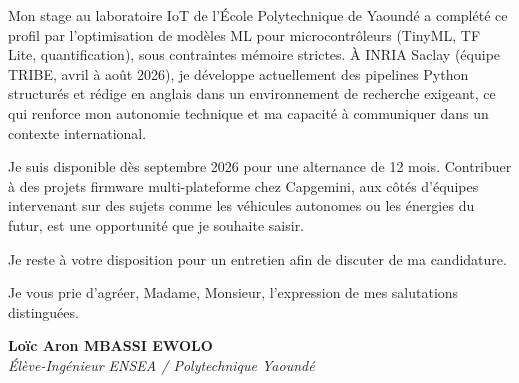 \documentclass[a4paper,11pt]{article}
\begin{document}
Mon stage au laboratoire IoT de l'École Polytechnique de Yaoundé a complété ce profil par l'optimisation de modèles ML pour microcontrôleurs (TinyML, TF Lite, quantification), sous contraintes mémoire strictes. À INRIA Saclay (équipe TRIBE, avril à août 2026), je développe actuellement des pipelines Python structurés et rédige en anglais dans un environnement de recherche exigeant, ce qui renforce mon autonomie technique et ma capacité à communiquer dans un contexte international.

Je suis disponible dès septembre 2026 pour une alternance de 12 mois. Contribuer à des projets firmware multi-plateforme chez Capgemini, aux côtés d'équipes intervenant sur des sujets comme les véhicules autonomes ou les énergies du futur, est une opportunité que je souhaite saisir.

Je reste à votre disposition pour un entretien afin de discuter de ma candidature.

Je vous prie d'agréer, Madame, Monsieur, l'expression de mes salutations distinguées.

\vspace{0.8cm}

\textbf{Loïc Aron MBASSI EWOLO}\\
\textit{Élève-Ingénieur ENSEA / Polytechnique Yaoundé}
\end{document}
